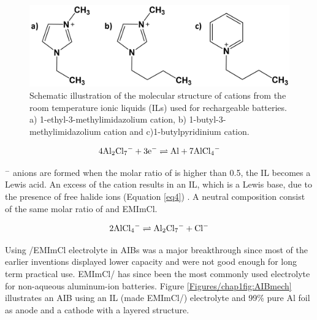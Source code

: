 \begin{figure}[tbh!]
\centering
\includegraphics[width=\textwidth]{Figures/chap1fig/cations}
\caption{Schematic illustration of the molecular structure of cations from the room temperature ionic liquids (ILs) used for rechargeable batteries. a) 1-ethyl-3-methylimidazolium cation, b) 1-butyl-3-methylimidazolium cation and c)1-butylpyridinium cation.}
\label{Figures/chap1fig:cations}
\end{figure}

\begin{align} \label{eq3}
   4\ce{Al2Cl7^{-}} + 3\ce{e-} \rightleftharpoons \ce{Al} + 7\ce{AlCl4^{-}}  
\end{align}

$^-$ anions are formed when the molar ratio of  is higher than 0.5, the IL becomes a Lewis acid. An excess of the cation results in an IL, which is a Lewis base, due to the presence of free halide ions (Equation \ref{eq4}) \cite{holbrey_ionic_1999}. A neutral composition consist of the same molar ratio of  and EMImCl. 

\begin{align}\label{eq4}
   2\ce{AlCl4^{-}} \rightleftharpoons \ce{Al2Cl7-}+\ce{Cl-} 
\end{align}

Using /EMImCl electrolyte in AIBs was a major breakthrough since most of the earlier inventions displayed lower capacity and were not good enough for long term practical use. EMImCl/  has since been the most commonly used electrolyte for non-aqueous aluminum-ion batteries.
Figure \ref{Figures/chap1fig:AIBmech} illustrates an AIB using an IL  (made EMImCl/) electrolyte and 99\% pure Al foil as anode and a cathode with a layered structure. 

